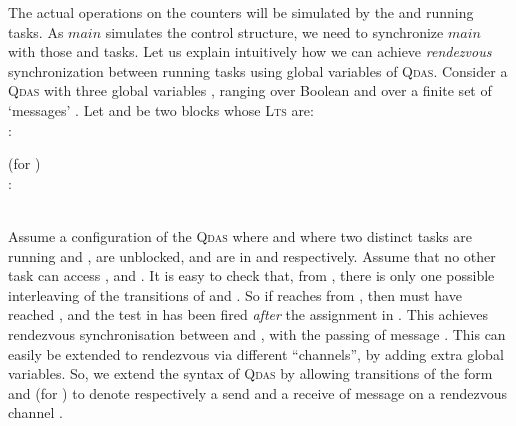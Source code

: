 \documentclass[runningheads,oribibl,]{article}
\newcommand{\main}{\ensuremath{\textit{main}}\xspace}
\newcommand{\lts}{\textsc{Lts}\xspace}
\newcommand{\qdas}{\textsc{Qdas}\xspace}
\begin{document}
The actual operations on the counters will be simulated by the
 and  running tasks. As \main simulates the control
structure, we need to synchronize
\main with those  and  tasks.  Let us explain
intuitively how we can achieve \emph{rendezvous} synchronization
between running tasks using global variables of \qdas. Consider a
\qdas with three global variables ,  ranging over
Boolean and  over a finite set of `messages' .
Let  and  be two blocks whose \lts
are:\\
: \hfill (for )\\
: \\
Assume a configuration  of the \qdas where  and
where two distinct tasks are running  and , are
unblocked, and are in  and  respectively.  Assume that no
other task can access ,  and . It is easy to check
that, from , there is only one possible interleaving of the transitions
of and . So if  reaches  from ,
then  must have reached , and the  test in
 has been fired \emph{after} the  assignment in
. This achieves rendezvous synchronisation between
 and , with the passing of message . This can
easily be extended to rendezvous via different ``channels'', by adding
extra global variables. So, we extend the syntax of
\qdas by allowing transitions of the form  and
 (for ) to denote respectively a send and a
receive of message  on a rendezvous channel .
\end{document}

